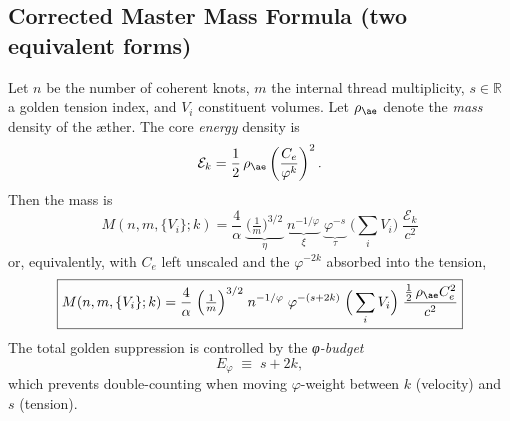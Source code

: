 \documentclass[12pt]{article}
\begin{document}
  \subsection*{Corrected Master Mass Formula (two equivalent forms)}

  Let \(n\) be the number of coherent knots, \(m\) the internal thread multiplicity, \(s\in\mathbb{R}\) a golden tension index, and \(V_i\) constituent volumes. Let \(\rho_{\ae}\) denote the \emph{mass} density of the æther. The core \emph{energy} density is
  \[
      \mathcal{E}_k=\frac{1}{2}\,\rho_{\ae}\left(\frac{C_e}{\varphi^k}\right)^2.
  \]
  Then the mass is
  \begin{equation}
      \boxed{
          M(n,m,\{V_i\};k)=\frac{4}{\alpha}\;
          \underbrace{\Big(\tfrac{1}{m}\Big)^{3/2}}_{\eta}\;
          \underbrace{n^{-1/\varphi}}_{\xi}\;
          \underbrace{\varphi^{-s}}_{\tau}\;
          \Big(\sum_i V_i\Big)\;
          \frac{\mathcal{E}_k}{c^2}
      }
      \label{eq:master-A}
  \end{equation}
  or, equivalently, with \(C_e\) left unscaled and the \(\varphi^{-2k}\) absorbed into the tension,
  \begin{equation}
      \boxed{
          M(n,m,\{V_i\};k)=\frac{4}{\alpha}\;
          \Big(\tfrac{1}{m}\Big)^{3/2}\;
          n^{-1/\varphi}\;
          \varphi^{-(s+2k)}\;
          \Big(\sum_i V_i\Big)\;
          \frac{\tfrac12\,\rho_{\ae} C_e^2}{c^2}
      }
      \label{eq:master-B}
  \end{equation}
  The total golden suppression is controlled by the \emph{φ-budget}
  \begin{equation}
      E_{\varphi}\;\equiv\;s+2k,
  \end{equation}
  which prevents double-counting when moving \(\varphi\)-weight between \(k\) (velocity) and \(s\) (tension).
\end{document}
